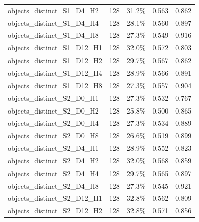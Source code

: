 \documentclass[11pt]{article}
\begin{document}
\begin{longtable}{p{}rrrr}
objects\_\allowbreak{}distinct\_\allowbreak{}S1\_\allowbreak{}D4\_\allowbreak{}H2 & 128 & 31.2\% & 0.563 & 0.862\\
objects\_\allowbreak{}distinct\_\allowbreak{}S1\_\allowbreak{}D4\_\allowbreak{}H4 & 128 & 28.1\% & 0.560 & 0.897\\
objects\_\allowbreak{}distinct\_\allowbreak{}S1\_\allowbreak{}D4\_\allowbreak{}H8 & 128 & 27.3\% & 0.549 & 0.916\\
objects\_\allowbreak{}distinct\_\allowbreak{}S1\_\allowbreak{}D12\_\allowbreak{}H1 & 128 & 32.0\% & 0.572 & 0.803\\
objects\_\allowbreak{}distinct\_\allowbreak{}S1\_\allowbreak{}D12\_\allowbreak{}H2 & 128 & 29.7\% & 0.567 & 0.862\\
objects\_\allowbreak{}distinct\_\allowbreak{}S1\_\allowbreak{}D12\_\allowbreak{}H4 & 128 & 28.9\% & 0.566 & 0.891\\
objects\_\allowbreak{}distinct\_\allowbreak{}S1\_\allowbreak{}D12\_\allowbreak{}H8 & 128 & 27.3\% & 0.557 & 0.904\\
objects\_\allowbreak{}distinct\_\allowbreak{}S2\_\allowbreak{}D0\_\allowbreak{}H1 & 128 & 27.3\% & 0.532 & 0.767\\
objects\_\allowbreak{}distinct\_\allowbreak{}S2\_\allowbreak{}D0\_\allowbreak{}H2 & 128 & 25.8\% & 0.500 & 0.865\\
objects\_\allowbreak{}distinct\_\allowbreak{}S2\_\allowbreak{}D0\_\allowbreak{}H4 & 128 & 27.3\% & 0.534 & 0.889\\
objects\_\allowbreak{}distinct\_\allowbreak{}S2\_\allowbreak{}D0\_\allowbreak{}H8 & 128 & 26.6\% & 0.519 & 0.899\\
objects\_\allowbreak{}distinct\_\allowbreak{}S2\_\allowbreak{}D4\_\allowbreak{}H1 & 128 & 28.9\% & 0.552 & 0.823\\
objects\_\allowbreak{}distinct\_\allowbreak{}S2\_\allowbreak{}D4\_\allowbreak{}H2 & 128 & 32.0\% & 0.568 & 0.859\\
objects\_\allowbreak{}distinct\_\allowbreak{}S2\_\allowbreak{}D4\_\allowbreak{}H4 & 128 & 29.7\% & 0.565 & 0.897\\
objects\_\allowbreak{}distinct\_\allowbreak{}S2\_\allowbreak{}D4\_\allowbreak{}H8 & 128 & 27.3\% & 0.545 & 0.921\\
objects\_\allowbreak{}distinct\_\allowbreak{}S2\_\allowbreak{}D12\_\allowbreak{}H1 & 128 & 32.8\% & 0.562 & 0.809\\
objects\_\allowbreak{}distinct\_\allowbreak{}S2\_\allowbreak{}D12\_\allowbreak{}H2 & 128 & 32.8\% & 0.571 & 0.856\\

\end{longtable}
\end{document}

